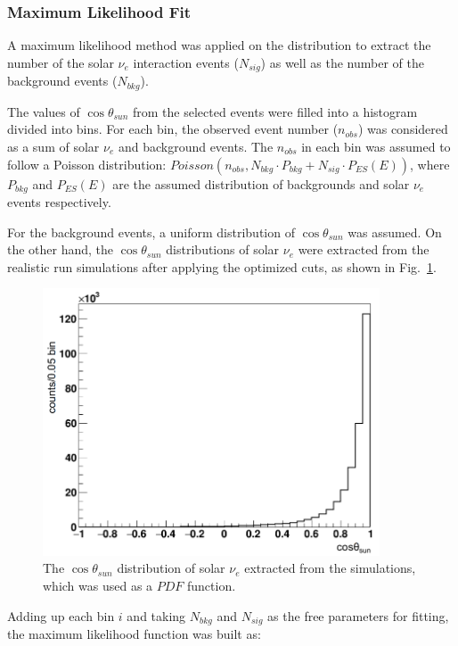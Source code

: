 \subsubsection{Maximum Likelihood Fit}\label{sect:poisson_fit}
A maximum likelihood method was applied on the distribution to extract the number of the solar $\nu_e$ interaction events ($N_{sig}$) as well as the number of the background events ($N_{bkg}$).

The values of $\cos\theta_{sun}$ from the selected events were filled into a histogram divided into bins.
For each bin, the observed event number ($n_{obs}$) was considered as a sum of solar $\nu_e$ and background events. The $n_{obs}$ in each bin was assumed to follow a Poisson distribution: $Poisson(n_{obs}, N_{bkg}\cdot P_{bkg}+N_{sig}\cdot P_{ES}(E))$, where $P_{bkg}$ and $P_{ES}(E)$ are the assumed distribution of backgrounds and solar $\nu_e$ events respectively.

For the background events, a uniform distribution of $\cos\theta_{sun}$ was assumed. On the other hand, the $\cos\theta_{sun}$ distributions of solar $\nu_e$ were extracted from the realistic run simulations after applying the optimized cuts, as shown in Fig.~\ref{solarPDF}. 

\begin{figure}[!htb]
	\centering
	\includegraphics[width=10cm]{solarPDF.png}
	\caption{The $\cos\theta_{sun}$ distribution of solar $\nu_e$ extracted from the simulations, which was used as a $PDF$ function.}
	\label{solarPDF}
\end{figure}

Adding up each bin $i$ and taking $N_{bkg}$ and $N_{sig}$ as the free parameters for fitting, the maximum likelihood function was built as\cite{pdg2020}:

